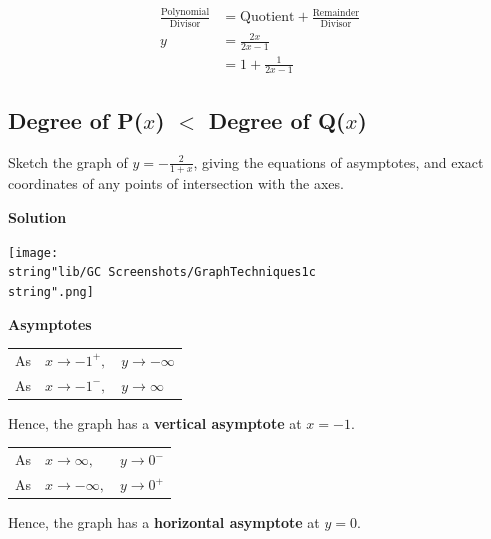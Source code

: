 \documentclass[11pt,a4paper]{book}
\begin{document}
\begin{align*}
\frac{\text{Polynomial}}{\text{Divisor}} & =\text{Quotient}+\frac{\text{Remainder}}{\text{Divisor}}\\
y & =\frac{2x}{2x-1}\\
 & =1+\frac{1}{2x-1}
\end{align*}


\subsection{Degree of P($x$) $<$ Degree of Q($x$) }

\begin{example}{}

Sketch the graph of ${\displaystyle y=-\frac{2}{1+x}}$, giving the
equations of asymptotes, and exact coordinates of any points of intersection
with the axes.

\textbf{Solution}
\begin{center}
\texttt{[image: \\string"lib/GC Screenshots/GraphTechniques1c\\string".png]}
\par\end{center}

\textbf{Asymptotes}

\medskip{}

\begin{tabular}{>{\raggedright}p{0.6cm}>{\raggedright}p{1.8cm}>{\raggedright}p{2cm}}
As & $x\rightarrow-1^{+},$ & $y\rightarrow-\infty$

\medskip{}\tabularnewline
As & $x\rightarrow-1^{-},$ & $y\rightarrow\infty$

\medskip{}\tabularnewline
\end{tabular}

Hence, the graph has a \textbf{vertical asymptote} at $x=-1$.

\medskip{}

\begin{tabular}{>{\raggedright}p{0.6cm}>{\raggedright}p{1.8cm}>{\raggedright}p{2cm}}
As & $x\rightarrow\infty,$ & $y\rightarrow0^{-}$

\medskip{}\tabularnewline
As & $x\rightarrow-\infty,$ & $y\rightarrow0^{+}$

\medskip{}\tabularnewline
\end{tabular}

Hence, the graph has a \textbf{horizontal asymptote} at $y=0$.

\newpage


\end{example}
\end{document}
